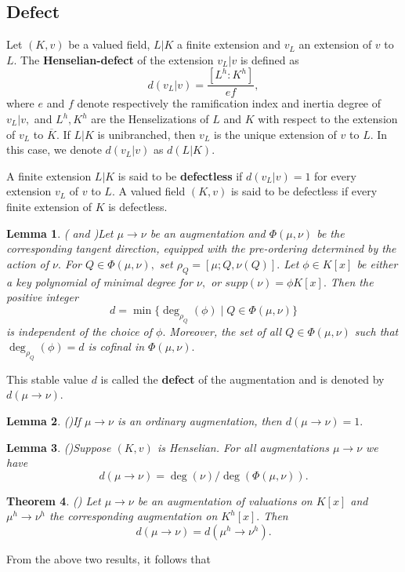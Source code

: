 \documentclass[11pt]{amsart}
\newtheorem{theorem}{Theorem}[section]
\newtheorem{lemma}[theorem]{Lemma}
\theoremstyle{definition}
\theoremstyle{remark}
\numberwithin{equation}{section}
\begin{document}
 	\subsection{Defect}
 
 Let $(K,v)$ be a valued field, $L|K$ a finite extension and $v_L$ an extension of $v$ to $L.$ The {\bf Henselian-defect} of the extension $v_L|v$ is defined as \[d(v_L|v)=\frac{[L^h:K^h]}{ef},\] where $e$ and $f$ denote respectively the ramification index and inertia degree of $v_L|v,$  and $L^h, K^h$ are the Henselizations of $L$ and $K$  with respect to the extension of $v_L$ to $\overline{K}.$  If $L|K$ is unibranched, then $v_L$ is the unique extension of $v$ to $L.$ In this case, we denote $d(v_L|v)$ as $d(L|K).$ 
 
 A finite extension $L|K$ is said to be {\bf defectless} if $d(v_L|v)=1$ for every extension $v_L$ of $v$ to $L.$ A valued field $(K,v)$ is said to be defectless if every finite extension of $K$ is defectless.
 

	
 \begin{lemma}(\cite{V0} and \cite[Lemma 6.1]{EN3})\label{def}
 	Let $\mu\longrightarrow \nu$ be an augmentation and $\Phi(\mu,\nu)$ be the corresponding tangent direction, equipped with the pre-ordering determined by the action of $\nu.$ For $Q\in\Phi(\mu,\nu) ,$ set $\rho_Q=[\mu;Q, \nu(Q)].$ Let $\phi \in K[x]$ be either a key polynomial of minimal degree for $\nu,$ or $supp(\nu)=\phi K[x].$ Then the positive integer \[d=\min\{\deg_{\rho_Q}(\phi) \mid Q\in \Phi(\mu,\nu)\}\] is independent of the choice of $\phi.$ Moreover, the set of all $Q\in \Phi(\mu,\nu)$ such that $\deg_{\rho_Q}(\phi)=d$ is cofinal in $\Phi(\mu,\nu).$
 \end{lemma}
 This stable value $d$ is called the {\bf defect} of the augmentation and is denoted by $d(\mu\longrightarrow \nu).$ 
 
 \begin{lemma}(\cite[Lemma 6.3]{EN3})\label{nl1}
 	If $\mu\longrightarrow \nu$ is an ordinary augmentation, then $d(\mu\longrightarrow \nu)=1.$
 \end{lemma}
 \begin{lemma}(\cite[Lemma 6.4]{EN3})\label{nl2}
 	Suppose $(K,v)$ is Henselian. For all augmentations $\mu\longrightarrow \nu$ we have
 	\[d(\mu\longrightarrow \nu)=\deg(\nu)/ \deg (\Phi(\mu,\nu)).\]
 \end{lemma}

 
 
 \begin{theorem}(\cite[Theorem 1.1]{EN3})
 	Let $\mu\longrightarrow\nu$ be an augmentation of valuations on $K[x]$ and $\mu^h\longrightarrow\nu^h$ the corresponding augmentation on $K^h[x].$ Then\[d(\mu\longrightarrow\nu)=d(\mu^h\longrightarrow\nu^h).\]
 \end{theorem}
 From the above two results, it follows that 
 
\end{document}
